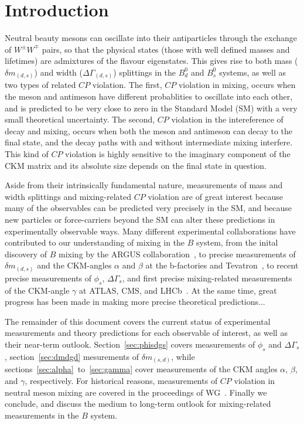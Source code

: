 \section{Introduction}
Neutral beauty mesons can oscillate into their antiparticles through the exchange of $W^\pm W^\mp$ pairs, so that the 
physical states (those with well defined masses and lifetimes) are admixtures of the flavour eigenstates. This gives
rise to both mass ($\delta m_{(d,s)}$) and width ($\Delta\Gamma_{(d,s)}$) splittings in the $B^0_d$ and $B^0_s$ systems, as well
as two types of related $CP$ violation. The first, $CP$ violation in mixing, occurs when the meson and antimeson have different
probablities to oscillate into each other, and is predicted to be very close to zero in the Standard Model (SM) with a very
small theoretical uncertainty. The second, $CP$ violation in the intereference of decay and mixing, occurs when both the meson
and antimeson can decay to the final state, and the decay paths with and without intermediate mixing interfere. This kind of $CP$
violation is highly sensitive to the imaginary component of the CKM matrix and its absolute size depends on the final state in question.

Aside from their intrinsically fundamental nature, measurements of mass and width splittings and mixing-related $CP$ violation are
of great interest because many of the observables can be predicted very precisely in the SM, and because new particles or force-carriers
beyond the SM can alter these predictions in experimentally observable ways. Many different experimental collaborations have contributed
to our understanding of mixing in the $B$ system, from the inital discovery of $B$ mixing by the ARGUS collaboration~\cite{}, to precise measurements
of $\delta m_{(d,s)}$ and the CKM-angles $\alpha$ and $\beta$ at the b-factories and Tevatron~\cite{}, to recent precise measurements
of $\phi_s$, $\Delta\Gamma_s$, and first precise mixing-related measurements of the CKM-angle $\gamma$ at ATLAS, CMS, and LHCb~\cite{}. At the same
time, great progress has been made in making more precise theoretical predictions...

The remainder of this document covers the current status of experimental measurements and theory predictions for each observable of
interest, as well as their near-term outlook. Section~\ref{sec:phisdgs} covers measurements of $\phi_s$ and $\Delta\Gamma_s$, section~\ref{sec:dmdgd} 
mesurements of $\delta m_{(s,d)}$, while sections~\ref{sec:alpha}~to~\ref{sec:gamma} cover measurements of the CKM angles $\alpha$, $\beta$, and $\gamma$, respectively.
For historical reasons, measurements of $CP$ violation in neutral meson mixing are covered in the proceedings of WG~\cite{}. Finally we conclude,
and discuss the medium to long-term outlook for mixing-related measurements in the $B$ system.


